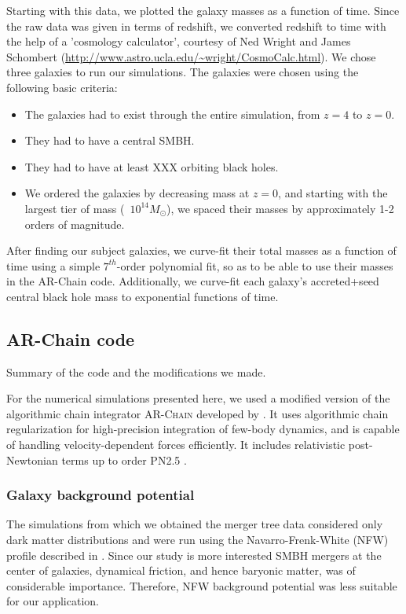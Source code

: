 \documentclass[english, apj]{emulateapj}
\begin{document}
Starting with this data, we plotted the galaxy masses as a function of time.  Since the raw data was given in terms of redshift, we converted redshift to time with the help of a 'cosmology calculator', courtesy of Ned Wright and James Schombert (\url{http://www.astro.ucla.edu/~wright/CosmoCalc.html}).  We chose three galaxies to run our simulations.  The galaxies were chosen using the following basic criteria:
\begin{itemize}
\item The galaxies had to exist through the entire simulation, from $z=4$ to $z=0$.
\item They had to have a central SMBH.
\item They had to have at least XXX orbiting black holes.
\item We ordered the galaxies by decreasing mass at $z=0$, and starting with the largest tier of mass (~$10^{14} M_{\odot}$), we spaced their masses by approximately 1-2 orders of magnitude.
\end{itemize}

After finding our subject galaxies, we curve-fit their total masses as a function of time using a simple $7^{th}$-order polynomial fit, so as to be able to use their masses in the AR-Chain code.  Additionally, we curve-fit each galaxy's accreted+seed central black hole mass to exponential functions of time.

\subsection{AR-Chain code}
Summary of the code and the modifications we made.

For the numerical simulations presented here, we used a modified version of the algorithmic chain integrator \textsc{AR-Chain} developed by \citet{2006MNRAS.372..219M}. It uses algorithmic chain regularization for high-precision integration of few-body dynamics, and is capable of handling velocity-dependent forces efficiently. It includes relativistic post-Newtonian terms up to order PN2.5 \citep{2008AJ....135.2398M}.


\subsubsection{Galaxy background potential}
The simulations from which we obtained the merger tree data considered only dark matter distributions and were run using the Navarro-Frenk-White (NFW) profile described in \citet{1997ApJ...490..493N}.  Since our study is more interested SMBH mergers at the center of galaxies, dynamical friction, and hence baryonic matter, was of considerable importance.  Therefore, NFW background potential was less suitable for our application.
\end{document}
